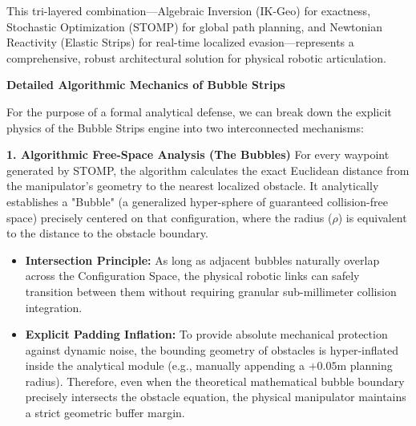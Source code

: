 \documentclass[11pt, a4paper]{article}
\begin{document}
\vspace{0.4cm}

This tri-layered combination---Algebraic Inversion (IK-Geo) for exactness, Stochastic Optimization (STOMP) for global path planning, and Newtonian Reactivity (Elastic Strips) for real-time localized evasion---represents a comprehensive, robust architectural solution for physical robotic articulation.


{\Large\textbf{Detailed Algorithmic Mechanics of Bubble Strips}}

For the purpose of a formal analytical defense, we can break down the explicit physics of the Bubble Strips engine into two interconnected mechanisms:

\vspace{0.6cm}

\textbf{1. Algorithmic Free-Space Analysis (The Bubbles)}
For every waypoint generated by STOMP, the algorithm calculates the exact Euclidean distance from the manipulator's geometry to the nearest localized obstacle. It analytically establishes a "Bubble" (a generalized hyper-sphere of guaranteed collision-free space) precisely centered on that configuration, where the radius ($\rho$) is equivalent to the distance to the obstacle boundary. 
\begin{itemize}
    \item \textbf{Intersection Principle:} As long as adjacent bubbles naturally overlap across the Configuration Space, the physical robotic links can safely transition between them without requiring granular sub-millimeter collision integration.
    \item \textbf{Explicit Padding Inflation:} To provide absolute mechanical protection against dynamic noise, the bounding geometry of obstacles is hyper-inflated inside the analytical module (e.g., manually appending a $+0.05$m planning radius). Therefore, even when the theoretical mathematical bubble boundary precisely intersects the obstacle equation, the physical manipulator maintains a strict geometric buffer margin.
\end{itemize}

\vspace{0.6cm}
\end{document}
